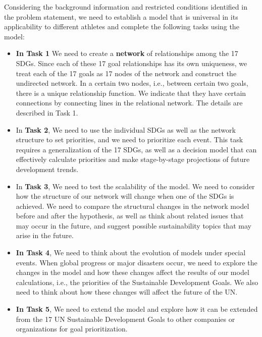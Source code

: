 Considering the background information and restricted conditions identified in the problem statement, we need to establish a model that is universal in its applicability to different athletes and complete the following tasks using the model:    
\begin{itemize}
    \item \textbf{In Task 1} We need to create a \textbf{network} of relationships among the 17 SDGs. Since each of these 17 goal relationships has its own uniqueness, we treat each of the 17 goals as 17 nodes of the network and construct the undirected network. In a certain two nodes, i.e., between certain two goals, there is a unique relationship function. We indicate that they have certain connections by connecting lines in the relational network. The details are described in Task 1.
    
    
    \item In \textbf{Task 2}, We need to use the individual SDGs as well as the network structure to set priorities, and we need to prioritize each event. This task requires a generalization of the 17 SDGs, as well as a decision model that can effectively calculate priorities and make stage-by-stage projections of future development trends.
    

    \item In \textbf{Task 3}, We need to test the scalability of the model. We need to consider how the structure of our network will change when one of the SDGs is achieved. We need to compare the structural changes in the network model before and after the hypothesis, as well as think about related issues that may occur in the future, and suggest possible sustainability topics that may arise in the future.
    
    \item \textbf{In Task 4}, We need to think about the evolution of models under special events. When global progress or major disasters occur, we need to explore the changes in the model and how these changes affect the results of our model calculations, i.e., the priorities of the Sustainable Development Goals. We also need to think about how these changes will affect the future of the UN.
    
    \item \textbf{In Task 5}, We need to extend the model and explore how it can be extended from the 17 UN Sustainable Development Goals to other companies or organizations for goal prioritization.


\end{itemize}
